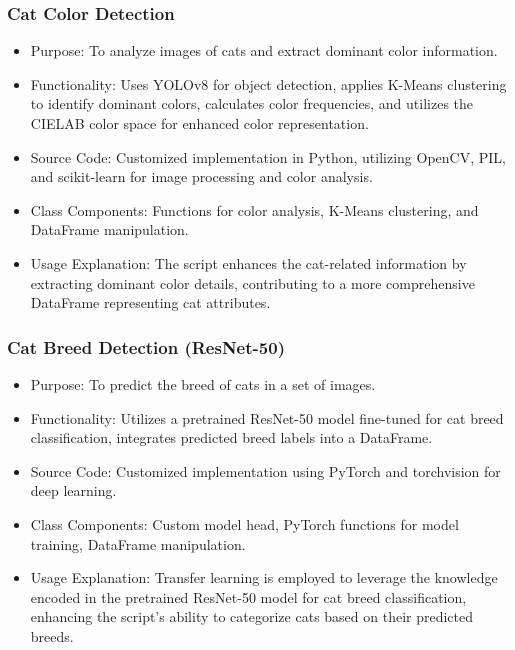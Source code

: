 \documentclass[conference]{IEEEtran}
\begin{document}
\subsubsection{Cat Color Detection}
\begin{itemize}
    \item Purpose: To analyze images of cats and extract dominant color information.
    \item Functionality: Uses YOLOv8 for object detection, applies K-Means clustering to identify dominant colors, calculates color frequencies, and utilizes the CIELAB color space for enhanced color representation.
    \item Source Code: Customized implementation in Python, utilizing OpenCV, PIL, and scikit-learn for image processing and color analysis.
    \item Class Components: Functions for color analysis, K-Means clustering, and DataFrame manipulation.
    \item Usage Explanation: The script enhances the cat-related information by extracting dominant color details, contributing to a more comprehensive DataFrame representing cat attributes.
    \vspace{0.5cm}
\end{itemize}

\subsubsection{Cat Breed Detection (ResNet-50)}
\begin{itemize}
    \item Purpose: To predict the breed of cats in a set of images.
    \item Functionality: Utilizes a pretrained ResNet-50 model fine-tuned for cat breed classification, integrates predicted breed labels into a DataFrame.
    \item Source Code: Customized implementation using PyTorch and torchvision for deep learning.
    \item Class Components: Custom model head, PyTorch functions for model training, DataFrame manipulation.
    \item Usage Explanation: Transfer learning is employed to leverage the knowledge encoded in the pretrained ResNet-50 model for cat breed classification, enhancing the script's ability to categorize cats based on their predicted breeds.
    \vspace{0.5cm}
\end{itemize}
\end{document}

